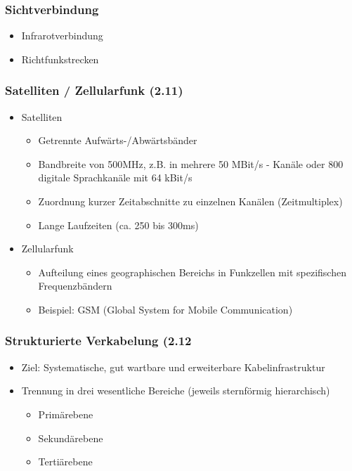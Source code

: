 \subsubsection{Sichtverbindung}
\begin{itemize}
	\item Infrarotverbindung
	\item Richtfunkstrecken
\end{itemize}

\subsubsection{Satelliten / Zellularfunk (2.11)}
\begin{itemize}
	\item Satelliten
	\begin{itemize}
		\item Getrennte Aufwärts-/Abwärtsbänder
		\item Bandbreite von 500MHz, z.B. in mehrere 50 MBit/s - Kanäle oder 800 digitale Sprachkanäle mit 64 kBit/s
		\item Zuordnung kurzer Zeitabschnitte zu einzelnen Kanälen (Zeitmultiplex)
		\item Lange Laufzeiten (ca. 250 bis 300ms)
	\end{itemize}
	\item Zellularfunk
	\begin{itemize}
		\item Aufteilung eines geographischen Bereichs in Funkzellen mit spezifischen Frequenzbändern
		\item Beispiel: GSM (Global System for Mobile Communication)
	\end{itemize}
\end{itemize}

\subsubsection{Strukturierte Verkabelung (2.12}
\begin{itemize}
	\item Ziel: Systematische, gut wartbare und erweiterbare Kabelinfrastruktur
	\item Trennung in drei wesentliche Bereiche (jeweils sternförmig hierarchisch)
	\begin{itemize}
		\item Primärebene
		\item Sekundärebene
		\item Tertiärebene
	\end{itemize}
\end{itemize}

